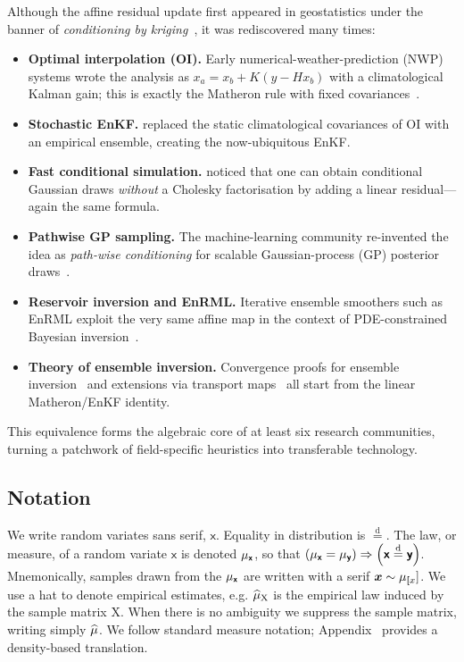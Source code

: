 \documentclass[wcp]{jmlr} %
\newcommand{\vv}[1]{\boldsymbol{#1}}
\newcommand{\mm}[1]{\mathrm{#1}}
\newcommand{\rv}[1]{\mathsf{#1}}
\newcommand{\vrv}[1]{\vv{\rv{#1}}}
\newcommand{\disteq}{\stackrel{\mathrm{d}}{=}}
\begin{document}
Although the affine residual update first appeared in geostatistics under the banner of \emph{conditioning by kriging}~\citep{Chiles2018Kriging}, it was rediscovered many times:
\begin{itemize}
    \item \textbf{Optimal interpolation (OI).}  Early numerical-weather-prediction (NWP) systems wrote the analysis as
    $x_a = x_b + K(y - Hx_b)$ with a climatological Kalman gain; this is exactly the Matheron rule with fixed covariances~\citep{Hunt2007Efficient}.
    \item \textbf{Stochastic EnKF.}  \citet{Evensen2003Ensemble} replaced the static climatological covariances of OI with an empirical ensemble, creating the now-ubiquitous EnKF.
    \item \textbf{Fast conditional simulation.}  \citet{Doucet2010Note} noticed that one can obtain conditional Gaussian draws \emph{without} a Cholesky factorisation by adding a linear residual—again the same formula.
    \item \textbf{Pathwise GP sampling.}  The machine-learning community re-invented the idea as \emph{path-wise conditioning} for scalable Gaussian-process (GP) posterior draws~\citep{Wilson2020Efficiently,Wilson2021Pathwise,Borovitskiy2023Matern}.
    \item \textbf{Reservoir inversion and EnRML.}  Iterative ensemble smoothers such as EnRML exploit the very same affine map in the context of PDE-constrained Bayesian inversion~\citep{Chen2012Ensemble}.
    \item \textbf{Theory of ensemble inversion.}  Convergence proofs for ensemble inversion~\citep{Schillings2016EnKFInverse} and extensions via transport maps~\citep{Spantini2022Coupling} all start from the linear Matheron/EnKF identity.
\end{itemize}

This equivalence forms the algebraic core of at least six research communities, turning a patchwork of field-specific heuristics into transferable technology.

\subsection{Notation}

We write random variates sans serif, $\vrv{x}$.
Equality in distribution is $\disteq$.
The law, or measure, of a random variate $\vrv{x}$ is denoted $\Law[\vrv{x}]$,
so that $\left(\Law[\vrv{x}]=\Law[\vrv{y}]\right) \Rightarrow \left(\vrv{x}\disteq\vrv{y}\right)$.
Mnemonically, samples drawn from the $\Law[\vrv{x}]$ are written with a serif $\vv{x}\sim\Law[\vrv[x]]$.
We use a hat to denote empirical estimates, e.g. \(\ELaw[\mm{X}]\) is the empirical law induced by the sample matrix \(\mm{X}\).
When there is no ambiguity we suppress the sample matrix, writing simply \(\widehat{\Law}\).
We follow standard measure notation; Appendix~ provides a density-based translation.
\end{document}
